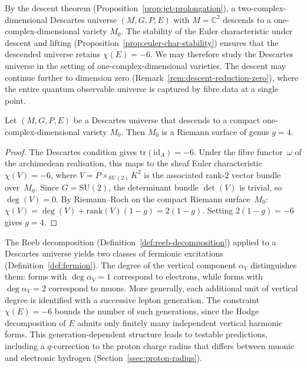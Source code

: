 
\begin{remark}
\label{rem:descent-one-dim}
By the descent theorem (Proposition~\ref{prop:jet-prolongation}), a
two-complex-dimensional Descartes universe $(M, G, P, E)$ with $M = \mathbb{C}^2$
descends to a one-complex-dimensional variety $M_0$.  The stability of the
Euler characteristic under descent and lifting
(Proposition~\ref{prop:euler-char-stability}) ensures that the descended
universe retains $\chi(E) = -6$.  We may therefore study the Descartes
universe in the setting of one-complex-dimensional varieties.
The descent may continue further to dimension zero
(Remark~\ref{rem:descent-reduction-zero}), where the entire quantum
observable universe is captured by fibre data at a single point.
\end{remark}


\begin{proposition}
\label{prop:genus-maximal-descent}
Let $(M, G, P, E)$ be a Descartes universe that descends to a compact
one-complex-dimensional variety $M_0$.  Then $M_0$ is a Riemann surface of
genus $g = 4$.
\end{proposition}

\begin{proof}
The Descartes condition gives $\mathrm{tr}(\mathrm{id}_A) = -6$.  Under the fibre functor~$\omega$ of the archimedean realisation, this maps to the sheaf Euler characteristic $\chi(V) = -6$, where $V = P \times_{\mathrm{SU}(2)} K^2$ is the associated rank-$2$ vector bundle over~$M_0$.  Since $G = \mathrm{SU}(2)$, the determinant bundle $\det(V)$ is trivial, so $\deg(V) = 0$.  By Riemann--Roch on the compact Riemann surface~$M_0$: $\chi(V) = \deg(V) + \mathrm{rank}(V)(1-g) = 2(1-g)$.  Setting $2(1-g) = -6$ gives $g = 4$.
\end{proof}


\begin{remark}
\label{rem:descartes-leptons}
The Reeb decomposition (Definition~\ref{def:reeb-decomposition}) applied to
a Descartes universe yields two classes of fermionic excitations
(Definition~\ref{def:fermion}).  The degree of the vertical component
$\alpha_V$ distinguishes them: forms with $\deg\alpha_V = 1$ correspond to
electrons, while forms with $\deg\alpha_V = 2$ correspond to muons.  More
generally, each additional unit of vertical degree is identified with a
successive lepton generation.  The constraint $\chi(E) = -6$ bounds the
number of such generations, since the Hodge decomposition of $E$ admits only
finitely many independent vertical harmonic forms.  This
generation-dependent structure leads to testable predictions, including a
$q$-correction to the proton charge radius that differs between muonic and
electronic hydrogen (Section~\ref{ssec:proton-radius}).
\end{remark}

